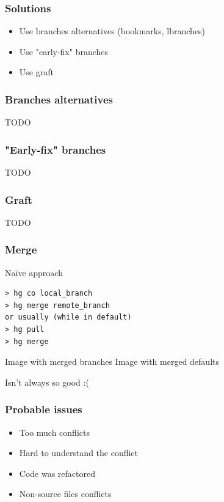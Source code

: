 \documentclass{beamer}
\begin{document}
\begin{frame} 
\frametitle{Solutions}
\begin{itemize}
\item Use branches alternatives (bookmarks, lbranches)
\item Use "early-fix" branches 
\item Use graft
\end{itemize}
\end{frame}

\begin{frame} 
\frametitle{Branches alternatives}
TODO
\end{frame}

\begin{frame}
\frametitle{"Early-fix" branches}
TODO
\end{frame}

\begin{frame}
\frametitle{Graft}
TODO
\end{frame}

\begin{frame}[fragile]
\frametitle{Merge}
\begin{exampleblock}{Naïve approach}
\begin{verbatim}
> hg co local_branch
> hg merge remote_branch
or usually (while in default)
> hg pull 
> hg merge 
\end{verbatim}
\end{exampleblock}
\begin{multicols}{2}
Image with merged branches
\columnbreak
{}
Image with merged defaults
\end{multicols}
\begin{center}
Isn't always so good :( 
\end{center}
\end{frame}

\begin{frame}
\frametitle{Probable issues}
\begin{itemize}
\item Too much conflicts
\item Hard to understand the conflict
\item Code was refactored
\item Non-source files conflicts
\end{itemize}
\end{frame}
\end{document}
